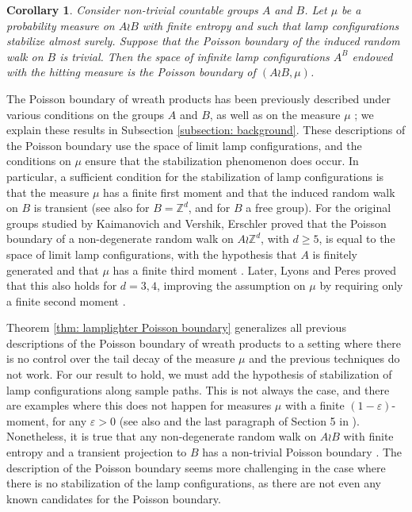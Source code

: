 \documentclass[reqno,oneside,11pt]{amsart}
\newcommand{\Z}{\mathbb{Z}}
\theoremstyle{plain}
\newtheorem{cor}[thm]{Corollary}
\theoremstyle{definition}
\begin{document}
\begin{cor}\label{cor: main cor of main theorem}
	Consider non-trivial countable groups $A$ and $B$. Let $\mu$ be a probability measure on $A\wr B$ with finite entropy and such that lamp configurations stabilize almost surely. Suppose that the Poisson boundary of the induced random walk on $B$ is trivial. Then the space of infinite lamp configurations $A^B$ endowed with the hitting measure is the Poisson boundary of $(A\wr B, \mu)$.
\end{cor}

The Poisson boundary of wreath products has been previously described under various conditions on the groups $A$ and $B$, as well as on the measure $\mu$ \cite{JamesPeres1996,Kaimanovich2001,KarlssonWoess2007,Sava2010,Erschler2011,LyonsPeres2021}; we explain these results in Subsection \ref{subsection: background}. These descriptions of the Poisson boundary use the space of limit lamp configurations, and the conditions on $\mu$ ensure that the stabilization phenomenon does occur. In particular, a sufficient condition for the stabilization of lamp configurations is that the measure $\mu$ has a finite first moment and that the induced random walk on $B$ is transient \cite[Lemma 1.1]{Erschler2011} (see also \cite[Theorem 3.3]{Kaimanovich1991} for $B=\Z^d$, and \cite[Theorem 2.9]{KarlssonWoess2007} for $B$ a free group). For the original groups studied by Kaimanovich and Vershik, Erschler proved that the Poisson boundary of a non-degenerate random walk on $A\wr \Z^d$, with $d\ge 5$, is equal to the space of limit lamp configurations, with the hypothesis that $A$ is finitely generated and that $\mu$ has a finite third moment \cite[Theorem 1]{Erschler2011}. Later, Lyons and Peres proved that this also holds for $d=3,4$, improving the assumption on $\mu$ by requiring only a finite second moment \cite[Theorem 5.1]{LyonsPeres2021}.  

Theorem \ref{thm: lamplighter Poisson boundary} generalizes all previous descriptions of the Poisson boundary of wreath products to a setting where there is no control over the tail decay of the measure $\mu$ and the previous techniques do not work. For our result to hold, we must add the hypothesis of stabilization of lamp configurations along sample paths. This is not always the case, and there are examples where this does not happen for measures $\mu$ with a finite $(1-\varepsilon)$-moment, for any $\varepsilon>0$ \cite[Proposition 1.1]{Kaimanovich1983} (see also \cite[Section 6]{Erschler2011} and the last paragraph of Section 5 in \cite{LyonsPeres2021}). Nonetheless, it is true that any non-degenerate random walk on $A\wr B$ with finite entropy and a transient projection to $B$ has a non-trivial Poisson boundary \cite[Theorem 3.1]{Erschler2004Liouville}. The description of the Poisson boundary seems more challenging in the case where there is no stabilization of the lamp configurations, as there are not even any known candidates for the Poisson boundary.
\end{document}
